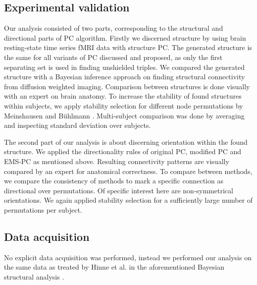 \documentclass[a4paper, 10pt, english, onecolumn]{article}
\begin{document}
\subsection{Experimental validation}
Our analysis consisted of two parts, corresponding to the structural and directional parts of PC algorithm.
Firstly we discerned structure by using brain resting-state time series fMRI data with structure PC.
The generated structure is the same for all variants of PC discussed and proposed, as only the first separating set is used in finding unshielded triples.
We compared the generated structure with a Bayesian inference approach on finding structural connectivity from diffusion weighted imaging.
Comparison between structures is done visually with an expert on brain anatomy.
To increase the stability of found structures within subjects, we apply stability selection for different node permutations by Meinshausen and B{\"u}hlmann \cite{meinshausen2010}.
Multi-subject comparison was done by averaging and inspecting standard deviation over subjects.

The second part of our analysis is about discerning orientation within the found structure.
We applied the directionality rules of original PC, modified PC and EMS-PC as mentioned above.
Resulting connectivity patterns are visually compared by an expert for anatomical correctness.
To compare between methods, we compare the consistency of methods to mark a specific connection as directional over permutations.
Of specific interest here are non-symmetrical orientations.
We again applied stability selection for a sufficiently large number of permutations per subject.

\subsection{Data acquisition}
No explicit data acquisition was performed, instead we performed our analysis on the same data as treated by Hinne et al. in the aforementioned Bayesian structural analysis \cite{hinne2013, hinne2013structfunc}.
\end{document}
